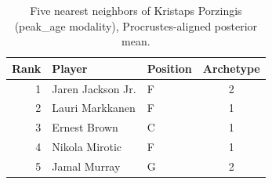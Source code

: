 \begin{table}[htbp]
  \centering\small
  \begin{tabular}{rllc}
    \toprule
    Rank & Player & Position & Archetype \\
    \midrule
    1 & Jaren Jackson Jr. & F & 2 \\
    2 & Lauri Markkanen & F & 1 \\
    3 & Ernest Brown & C & 1 \\
    4 & Nikola Mirotic & F & 1 \\
    5 & Jamal Murray & G & 2 \\
    \bottomrule
  \end{tabular}
  \caption{Five nearest neighbors of Kristaps Porzingis (peak_age modality), Procrustes-aligned posterior mean.}
  \label{tab:Kristaps_Porzingis_neighbors_peak_age}
\end{table}

